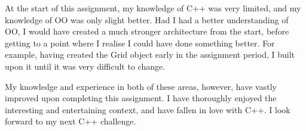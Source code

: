 \documentclass[11pt, article]{article}
\begin{document}
	At the start of this assignment, my knowledge of C++ was very limited, and my knowledge of OO was only slight better. Had I had a better understanding of OO, I would have created a much stronger architecture from the start, before getting to a point where I realise I could have done something better. For example, having created the Grid object early in the assignment period, I built upon it until it was very difficult to change. 
	
	My knowledge and experience in both of these areas, however, have vastly improved upon completing this assignment. I have thoroughly enjoyed the interesting and entertaining context, and have fallen in love with C++. I look forward to my next C++ challenge. 




\end{document}
